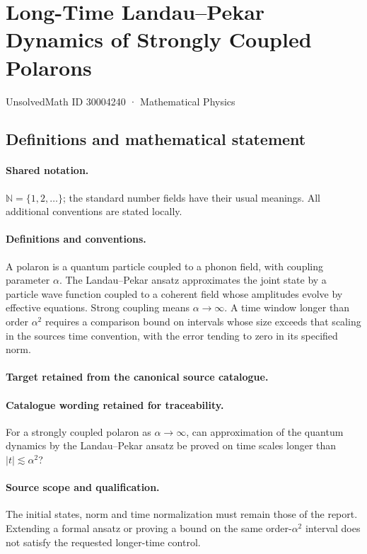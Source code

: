 \documentclass[11pt]{article}
\begin{document}
\setcounter{section}{30004239}
\section{Long-Time Landau–Pekar Dynamics of Strongly Coupled Polarons}\label{30004240}
{\small UnsolvedMath ID 30004240 · Mathematical Physics}
\subsection{Definitions and mathematical statement}

\paragraph{Shared notation.}$\mathbb N=\{1,2,\ldots\}$; the standard number fields have their usual meanings. All additional conventions are stated locally.


\paragraph{Definitions and conventions.}
A polaron is a quantum particle coupled to a phonon field, with coupling parameter $\alpha$. The Landau--Pekar ansatz approximates the joint state by a particle wave function coupled to a coherent field whose amplitudes evolve by effective equations. Strong coupling means $\alpha\to\infty$. A time window longer than order $\alpha^2$ requires a comparison bound on intervals whose size exceeds that scaling in the source\textquotesingle s time convention, with the error tending to zero in its specified norm.

\paragraph{Target retained from the canonical source catalogue.}
\paragraph{Catalogue wording retained for traceability.}
For a strongly coupled polaron as $\alpha\to\infty$, can approximation of the quantum dynamics by the Landau–Pekar ansatz be proved on time scales longer than $\lvert t\rvert\lesssim\alpha^2$?

\paragraph{Source scope and qualification.}
The initial states, norm and time normalization must remain those of the report. Extending a formal ansatz or proving a bound on the same order-$\alpha^2$ interval does not satisfy the requested longer-time control.
\end{document}
